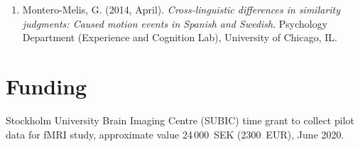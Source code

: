 \documentclass[margin, 11pt]{res} %
\begin{document}
\begin{resume}
\begin{enumerate}
\item Montero-Melis, G. (2014, April). \textit{Cross-linguistic differences in similarity judgments: Caused motion events in Spanish and Swedish}. Psychology Department (Experience and Cognition Lab), University of Chicago, IL.

\end{enumerate}



%
%
%
%
%
%
%




\section{\sc Funding}


Stockholm University Brain Imaging Centre (SUBIC) time grant to collect pilot data for fMRI study, approximate value 24\,000~SEK (2300~EUR), June 2020.


\end{resume}
\end{document}
